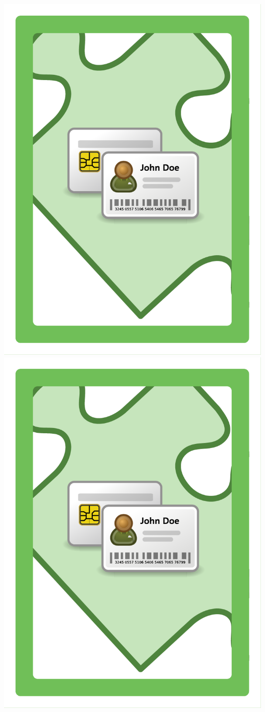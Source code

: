 \documentclass{letter}
\begin{document}
\includegraphics{lo0t/lo0t.shares_auth}
\includegraphics{lo0t/lo0t.shares_auth}
\end{document}
